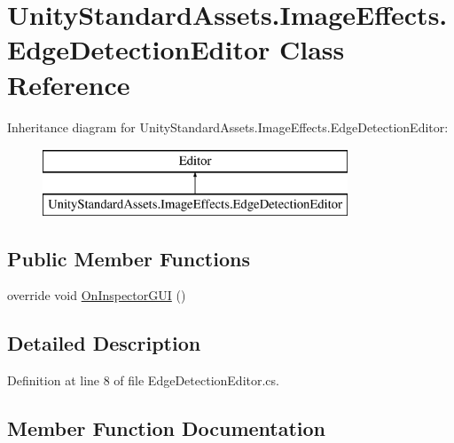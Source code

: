 \hypertarget{class_unity_standard_assets_1_1_image_effects_1_1_edge_detection_editor}{}\section{Unity\+Standard\+Assets.\+Image\+Effects.\+Edge\+Detection\+Editor Class Reference}
\label{class_unity_standard_assets_1_1_image_effects_1_1_edge_detection_editor}
Inheritance diagram for Unity\+Standard\+Assets.\+Image\+Effects.\+Edge\+Detection\+Editor\+:\begin{figure}[H]
\begin{center}
\leavevmode
\includegraphics[height=2.000000cm]{class_unity_standard_assets_1_1_image_effects_1_1_edge_detection_editor}
\end{center}
\end{figure}
\subsection*{Public Member Functions}
\begin{DoxyCompactItemize}
\item 
override void \mbox{\hyperlink{class_unity_standard_assets_1_1_image_effects_1_1_edge_detection_editor_a1aa2bcc1e6cd33a069ac1654332b4408}{On\+Inspector\+G\+UI}} ()
\end{DoxyCompactItemize}


\subsection{Detailed Description}


Definition at line 8 of file Edge\+Detection\+Editor.\+cs.



\subsection{Member Function Documentation}
\mbox{\label{class_unity_standard_assets_1_1_image_effects_1_1_edge_detection_editor_a1aa2bcc1e6cd33a069ac1654332b4408}} 
